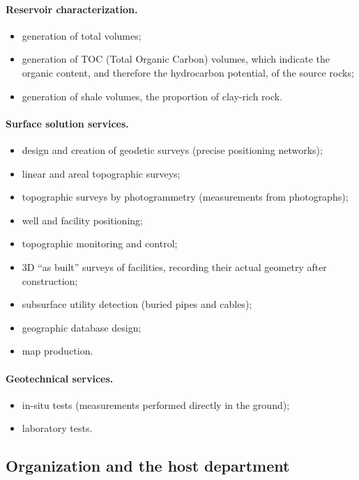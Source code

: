 \documentclass[letterpaper,11pt,leqno]{article}
\begin{document}
\paragraph{Reservoir characterization.}
\begin{itemize}
\item generation of total volumes; %
\item generation of TOC (Total Organic Carbon) volumes, which indicate the
  organic content, and therefore the hydrocarbon potential, of the source rocks;
\item generation of shale volumes, the proportion of clay-rich rock.
\end{itemize}

\paragraph{Surface solution services.}
\begin{itemize}
\item design and creation of geodetic surveys (precise positioning networks);
\item linear and areal topographic surveys;
\item topographic surveys by photogrammetry (measurements from photographs);
\item well and facility positioning;
\item topographic monitoring and control;
\item 3D ``as built'' surveys of facilities, recording their actual geometry after
  construction;
\item subsurface utility detection (buried pipes and cables);
\item geographic database design;
\item map production.
\end{itemize}

\paragraph{Geotechnical services.} %
\begin{itemize}
\item in-situ tests (measurements performed directly in the ground);
\item laboratory tests.
\end{itemize}

\subsection{Organization and the host department}
\end{document}
